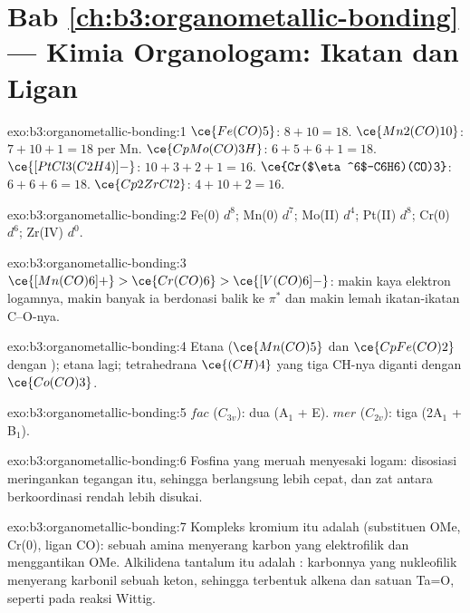 \section*{Bab \ref{ch:b3:organometallic-bonding} --- Kimia Organologam: Ikatan dan Ligan}

\begin{solution}{exo:b3:organometallic-bonding:1}
$\ce{Fe(CO)5}$: $8 + 10 = 18$. $\ce{Mn2(CO)10}$: $7 + 10 + 1 = 18$ per Mn. $\ce{CpMo(CO)3H}$: $6 + 5 + 6 + 1 =
18$. $\ce{[PtCl3(C2H4)]-}$: $10 + 3 + 2 + 1 = 16$. $\ce{Cr($\eta^6$-C6H6)(CO)3}$: $6 + 6 + 6 = 18$. $\ce{Cp2ZrCl2}$:
$4 + 10 + 2 = 16$.
\end{solution}

\begin{solution}{exo:b3:organometallic-bonding:2}
Fe(0) $d^8$; Mn(0) $d^7$; Mo(II) $d^4$; Pt(II) $d^8$; Cr(0) $d^6$; Zr(IV) $d^0$.
\end{solution}

\begin{solution}{exo:b3:organometallic-bonding:3}
$\ce{[Mn(CO)6]+} > \ce{Cr(CO)6} > \ce{[V(CO)6]-}$: makin kaya elektron logamnya, makin banyak ia
berdonasi balik ke $\pi^*$ dan makin lemah ikatan-ikatan C--O-nya.
\end{solution}

\begin{solution}{exo:b3:organometallic-bonding:4}
Etana ($\ce{Mn(CO)5}$ dan $\ce{CpFe(CO)2}$  dengan ); etana lagi; tetrahedrana
$\ce{(CH)4}$ yang tiga CH-nya diganti dengan $\ce{Co(CO)3}$.
\end{solution}

\begin{solution}{exo:b3:organometallic-bonding:5}
$fac$ ($C_{3v}$): dua (A$_1$ + E). $mer$ ($C_{2v}$): tiga (2A$_1$ + B$_1$).
\end{solution}

\begin{solution}{exo:b3:organometallic-bonding:6}
Fosfina yang meruah menyesaki logam: disosiasi meringankan tegangan itu, sehingga
berlangsung lebih cepat, dan zat antara berkoordinasi rendah lebih disukai.
\end{solution}

\begin{solution}{exo:b3:organometallic-bonding:7}
Kompleks kromium itu adalah  (substituen OMe, Cr(0), ligan CO): sebuah
amina menyerang karbon  yang elektrofilik dan menggantikan OMe. Alkilidena
tantalum itu adalah : karbonnya yang nukleofilik menyerang karbonil sebuah
keton, sehingga terbentuk alkena dan satuan Ta=O, seperti pada reaksi Wittig.
\end{solution}


